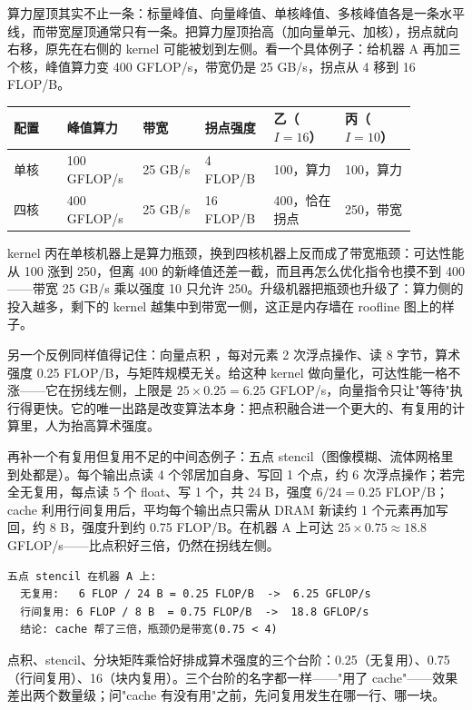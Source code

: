 算力屋顶其实不止一条：标量峰值、向量峰值、单核峰值、多核峰值各是一条水平线，而带宽屋顶通常只有一条。把算力屋顶抬高（加向量单元、加核），拐点就向右移，原先在右侧的 kernel 可能被划到左侧。看一个具体例子：给机器 A 再加三个核，峰值算力变 400 GFLOP/s，带宽仍是 25 GB/s，拐点从 4 移到 16 FLOP/B。

\begin{longtable}{L{0.12\linewidth}L{0.16\linewidth}L{0.14\linewidth}L{0.14\linewidth}L{0.16\linewidth}L{0.16\linewidth}}
\toprule
配置 & 峰值算力 & 带宽 & 拐点强度 & 乙（$I=16$） & 丙（$I=10$） \\
\midrule
单核 & 100 GFLOP/s & 25 GB/s & 4 FLOP/B & 100，算力 & 100，算力 \\
四核 & 400 GFLOP/s & 25 GB/s & 16 FLOP/B & 400，恰在拐点 & 250，带宽 \\
\bottomrule
\end{longtable}

kernel 丙在单核机器上是算力瓶颈，换到四核机器上反而成了带宽瓶颈：可达性能从 100 涨到 250，但离 400 的新峰值还差一截，而且再怎么优化指令也摸不到 400——带宽 25 GB/s 乘以强度 10 只允许 250。升级机器把瓶颈也升级了：算力侧的投入越多，剩下的 kernel 越集中到带宽一侧，这正是内存墙在 roofline 图上的样子。

另一个反例同样值得记住：向量点积 ，每对元素 2 次浮点操作、读 8 字节，算术强度 0.25 FLOP/B，与矩阵规模无关。给这种 kernel 做向量化，可达性能一格不涨——它在拐线左侧，上限是 $25\times0.25=6.25$ GFLOP/s，向量指令只让"等待"执行得更快。它的唯一出路是改变算法本身：把点积融合进一个更大的、有复用的计算里，人为抬高算术强度。

再补一个有复用但复用不足的中间态例子：五点 stencil（图像模糊、流体网格里到处都是）。每个输出点读 4 个邻居加自身、写回 1 个点，约 6 次浮点操作；若完全无复用，每点读 5 个 float、写 1 个，共 24 B，强度 $6/24=0.25$ FLOP/B；cache 利用行间复用后，平均每个输出点只需从 DRAM 新读约 1 个元素再加写回，约 8 B，强度升到约 0.75 FLOP/B。在机器 A 上可达 $25\times0.75\approx18.8$ GFLOP/s——比点积好三倍，仍然在拐线左侧。

\begin{lstlisting}
五点 stencil 在机器 A 上:
  无复用:   6 FLOP / 24 B = 0.25 FLOP/B  ->  6.25 GFLOP/s
  行间复用: 6 FLOP / 8 B  = 0.75 FLOP/B  ->  18.8 GFLOP/s
  结论: cache 帮了三倍，瓶颈仍是带宽(0.75 < 4)
\end{lstlisting}

点积、stencil、分块矩阵乘恰好排成算术强度的三个台阶：0.25（无复用）、0.75（行间复用）、16（块内复用）。三个台阶的名字都一样——"用了 cache"——效果差出两个数量级；问"cache 有没有用"之前，先问复用发生在哪一行、哪一块。

